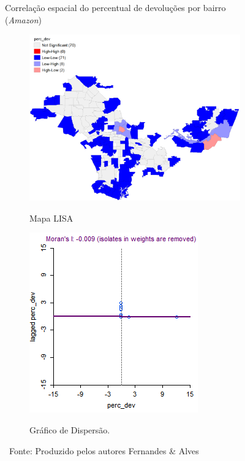 \begin{figure}[H]
    \centering
     \caption{Correlação espacial do percentual de devoluções por bairro (\textit{Amazon})}
     \begin{subfigure}{.45\textwidth}
         \centering
         \caption{Mapa LISA}
         \includegraphics[height=0.75\textwidth]{images/6_amazon/geoda/BairrosLA_DEV_lisa.png}
         \label{fig:AMAZON_LISA_DEV}
     \end{subfigure}
     \begin{subfigure}{.45\textwidth}
       \centering
       \caption{Gráfico de Dispersão.}
       \includegraphics[height=0.75\textwidth]{images/6_amazon/geoda/BairrosLA_DEV_scatter.png}
       \label{fig:AMAZON_SCT_DEV}
     \end{subfigure}
     \caption*{\ Fonte: Produzido pelos autores Fernandes \& Alves}
 \end{figure} %

